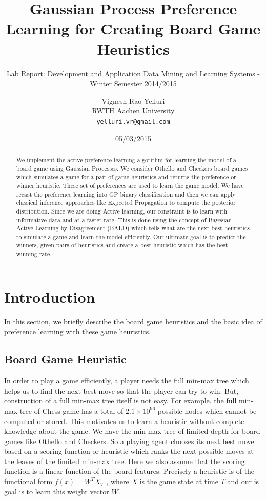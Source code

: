 \documentclass{scrartcl}
\title{Gaussian Process Preference Learning for Creating Board Game Heuristics}
\subtitle{Lab Report: Development and Application Data Mining and Learning Systems - Winter Semester 2014/2015}
\date{05/03/2015}
\author{Vignesh Rao Yelluri \\ RWTH Aachen University \\ \texttt{yelluri.vr@gmail.com}}
\begin{document}
\maketitle


\begin{abstract}
We implement the active preference learning algorithm for learning the model of a  board game using Gaussian Processes. We consider Othello and Checkers board games which simulates a game for a pair of game heuristics and returns the preference or winner heuristic. These set of preferences are used to learn the game model. We have recast the preference learning into GP binary classification and then we can apply classical inference approaches like Expected Propagation to compute the posterior distribution. Since we are doing Active learning, our constraint is to learn with informative data and at a faster rate. This is done using the concept of Bayesian Active Learning by Disagreement (BALD) which tells what are the next best heuristics  to simulate a game and learn the model efficiently. Our ultimate goal is to predict the winners, given pairs of heuristics and create a best heuristic which has the best winning rate.
\end{abstract}

\section{Introduction}
	In this section, we briefly describe the board game heuristics and the basic idea of preference learning with these game heuristics.

\subsection{Board Game Heuristic}
	In order to play a game efficiently, a player needs the full min-max tree which helps us to find the next best move so that the player can try to win. But, construction of a full min-max tree itself is not easy. For example. the full min-max tree of Chess game has a total of $2.1\times10^{96}$ possible nodes which cannot be computed or stored. This motivates us to learn a heuristic without complete knowledge about the game. We have the min-max tree of limited depth for board games like Othello and Checkers. So a playing agent chooses its next best move based on a scoring function or heuristic which ranks the next possible moves at the leaves of the limited min-max tree. Here we also assume that the scoring function is a linear function of the board features. Precisely a heuristic is of the functional form $f(x) = W^{T}X_T$ , where $X$ is the game state at time $T$ and our is goal is to learn this weight vector $W$.
\end{document}
